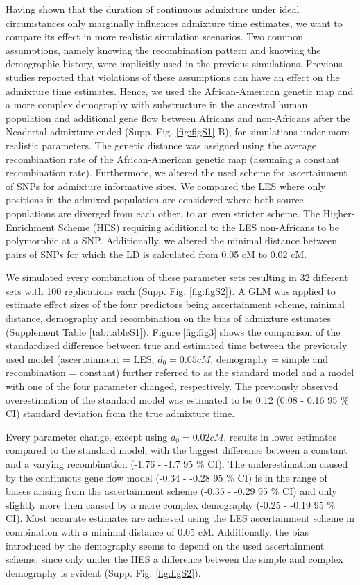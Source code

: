 \documentclass[]{article}
\begin{document}
Having shown that the duration of continuous admixture under ideal
circumstances only marginally influences admixture time
estimates, we want to compare its effect in more realistic simulation scenarios. Two common assumptions, namely knowing the recombination pattern and knowing the demographic history, were implicitly used in the previous simulations.
Previous studies reported that violations of these assumptions can have an effect on the admixture time estimates.
Hence, we used the African-American genetic map and a more complex demography with substructure in the ancestral human population and additional gene flow between Africans and non-Africans after the Neadertal admixture ended (Supp. Fig. \ref{fig:figS1} B), for simulations under more realistic parameters. The genetic distance was assigned using the average recombination rate of the African-American genetic map (assuming a constant recombination rate).
Furthermore, we altered the used scheme for ascertainment of SNPs for admixture informative sites. We compared the LES where only
positions in the admixed population are considered where both source
populations are diverged from each other, to an even stricter scheme. The Higher-Enrichment Scheme (HES) requiring additional
to the LES non-Africans to be polymorphic at a SNP. Additionally, we altered the minimal distance between pairs of SNPs for which the LD is calculated from 0.05 cM to 0.02 cM.



We simulated every combination of these parameter sets resulting in 32
different sets with 100 replications each (Supp. Fig. \ref{fig:figS2}).
A GLM was applied to estimate effect sizes of the four predictors being
ascertainment scheme, minimal distance, demography and recombination on
the bias of admixture estimates (Supplement Table \ref{tab:tableS1}).
Figure \ref{fig:fig3} shows the comparison of the standardized
difference between true and estimated time between the previously used
model (ascertainment = LES, \(d_{0} = 0.05 cM\), demography = simple and
recombination = constant) further referred to as the standard model and
a model with one of the four parameter changed, respectively. The
previously observed overestimation of the standard model was estimated
to be 0.12 (0.08 - 0.16 95 \% CI) standard deviation from the true
admixture time.

Every parameter change, except using \(d_{0} = 0.02 cM\), results in lower estimates compared to the
standard model, with the biggest difference between a constant and a
varying recombination (-1.76 - -1.7 95 \% CI). The
underestimation caused by the continuous gene flow model (-0.34 -
-0.28 95 \% CI) is in the range of biases arising from the ascertainment scheme (-0.35 -
-0.29 95 \% CI) and only slightly more then caused by a more complex demography (-0.25 -
-0.19 95 \% CI). Most accurate estimates are achieved using the LES
ascertainment scheme in combination with a minimal distance of 0.05 cM.
Additionally, the bias introduced by the demography seems to depend on
the used ascertainment scheme, since only under the HES a difference
between the simple and complex demography is evident (Supp. Fig.
\ref{fig:figS2}).
\end{document}
